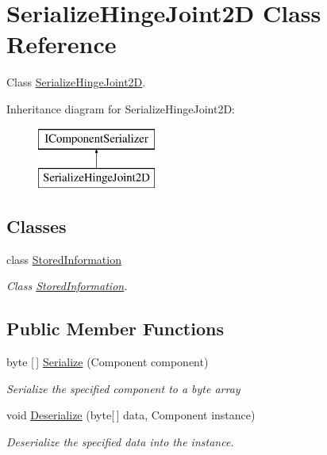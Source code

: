 \hypertarget{class_serialize_hinge_joint2_d}{}\section{Serialize\+Hinge\+Joint2D Class Reference}
\label{class_serialize_hinge_joint2_d}


Class \hyperlink{class_serialize_hinge_joint2_d}{Serialize\+Hinge\+Joint2D}.  


Inheritance diagram for Serialize\+Hinge\+Joint2D\+:\begin{figure}[H]
\begin{center}
\leavevmode
\includegraphics[height=2.000000cm]{class_serialize_hinge_joint2_d}
\end{center}
\end{figure}
\subsection*{Classes}
\begin{DoxyCompactItemize}
\item 
class \hyperlink{class_serialize_hinge_joint2_d_1_1_stored_information}{Stored\+Information}
\begin{DoxyCompactList}\small\item\em Class \hyperlink{class_serialize_hinge_joint2_d_1_1_stored_information}{Stored\+Information}. \end{DoxyCompactList}\end{DoxyCompactItemize}
\subsection*{Public Member Functions}
\begin{DoxyCompactItemize}
\item 
byte \mbox{[}$\,$\mbox{]} \hyperlink{class_serialize_hinge_joint2_d_a1e2a66811e08e2e87ea97ca28b65b844}{Serialize} (Component component)
\begin{DoxyCompactList}\small\item\em Serialize the specified component to a byte array \end{DoxyCompactList}\item 
void \hyperlink{class_serialize_hinge_joint2_d_aad33e878c1b722e388f05fe1892157e8}{Deserialize} (byte\mbox{[}$\,$\mbox{]} data, Component instance)
\begin{DoxyCompactList}\small\item\em Deserialize the specified data into the instance. \end{DoxyCompactList}\end{DoxyCompactItemize}


